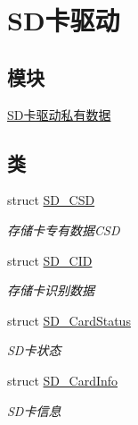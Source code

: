 \hypertarget{group__sd__card}{}\section{S\+D卡驱动}
\label{group__sd__card}
\subsection*{模块}
\begin{DoxyCompactItemize}
\item 
\hyperlink{group__sd__card__private}{S\+D卡驱动私有数据}
\end{DoxyCompactItemize}
\subsection*{类}
\begin{DoxyCompactItemize}
\item 
struct \hyperlink{struct_s_d___c_s_d}{S\+D\+\_\+\+C\+SD}
\begin{DoxyCompactList}\small\item\em 存储卡专有数据\+C\+SD \end{DoxyCompactList}\item 
struct \hyperlink{struct_s_d___c_i_d}{S\+D\+\_\+\+C\+ID}
\begin{DoxyCompactList}\small\item\em 存储卡识别数据 \end{DoxyCompactList}\item 
struct \hyperlink{struct_s_d___card_status}{S\+D\+\_\+\+Card\+Status}
\begin{DoxyCompactList}\small\item\em S\+D卡状态 \end{DoxyCompactList}\item 
struct \hyperlink{struct_s_d___card_info}{S\+D\+\_\+\+Card\+Info}
\begin{DoxyCompactList}\small\item\em S\+D卡信息 \end{DoxyCompactList}\end{DoxyCompactItemize}
